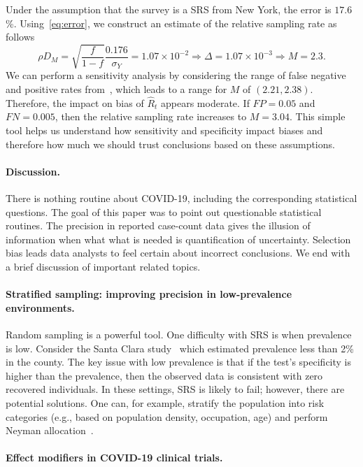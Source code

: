 \documentclass[12pt]{article}
\begin{document}
Under the assumption that the survey is a SRS from New York, the error is $17.6$\%.  Using~\eqref{eq:error}, we construct an estimate of the relative sampling rate as follows
\[
\rho D_M = \sqrt{\frac{f}{1-f}} \frac{\text{0.176}}{\sigma_Y} = 1.07 \times 10^{-2} \Rightarrow \Delta = 1.07 \times 10^{-3} \Rightarrow M = 2.3.
\]
We can perform a sensitivity analysis by considering the range of false negative and positive rates from~\cite{Bendavid2020}, which leads to a range for $M$ of $(2.21, 2.38)$.  Therefore, the impact on bias of $\hat R_t$ appears moderate.  If $FP = 0.05$ and $FN = 0.005$, then the relative sampling rate increases to $M=3.04$.  This simple tool helps us understand how sensitivity and specificity impact biases and  therefore how much we should trust conclusions based on these assumptions.

\paragraph*{Discussion.}
There is nothing routine about COVID-19, including the corresponding statistical questions.  The goal of this paper was to point out questionable statistical routines.  The precision in reported case-count data gives the illusion of information when what what is needed is quantification of uncertainty. Selection bias leads data analysts to feel certain about incorrect conclusions.  We end with a brief discussion of important related topics.

\paragraph*{Stratified sampling: improving precision in low-prevalence environments.}
Random sampling is a powerful tool.  One difficulty with SRS is when prevalence is low.  Consider the Santa Clara study~\cite{Bendavid2020} which estimated prevalence less than 2\% in the county.  The key issue with low prevalence is that if the test's specificity is higher than the prevalence, then the observed data is consistent with zero recovered individuals. In these settings, SRS is likely to fail; however, there are potential solutions.  One can, for example, stratify the population into risk categories (e.g., based on population density, occupation, age) and perform Neyman allocation~\cite{Cochran77}.

\paragraph*{Effect modifiers in COVID-19 clinical trials.}
\end{document}
